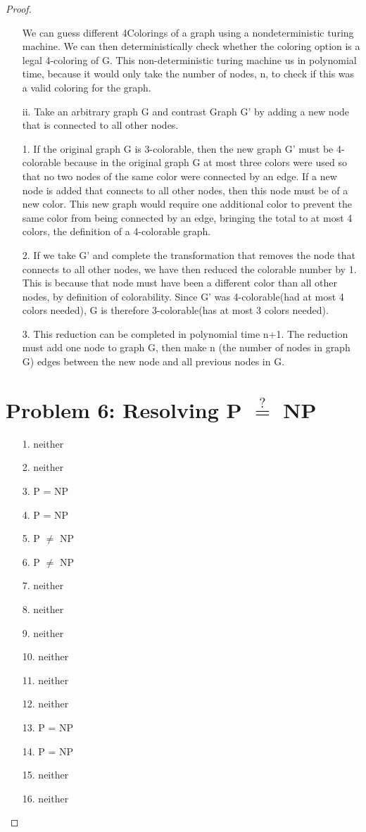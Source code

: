 \documentclass[10pt,letter]{article}
\begin{document}
\begin{proof}
\begin{enumerate}
We can guess different 4Colorings of a graph using a nondeterministic turing machine. We can then deterministically check whether the coloring option is a legal 4-coloring of G. This non-deterministic turing machine us in polynomial time, because it would only take the number of nodes, n, to check if this was a valid coloring for the graph. 
\item[ii.]
Take an arbitrary graph G and contrast Graph G' by adding a new node that is connected to all other nodes. 
\item[1.] If the original graph G is 3-colorable, then the new graph G' must be 4-colorable because in the original graph G at most three colors were used so that no two nodes of the same color were connected by an edge. If a new node is added that connects to all other nodes, then this node must be of a new color. This new graph would require one additional color to prevent the same color from being connected by an edge, bringing the total to at most 4 colors, the definition of  a 4-colorable graph. 
\item[2.]
If we take G' and complete the transformation that removes the node that connects to all other nodes, we have then reduced the colorable number by 1. This is because that node must have been a different color than all other nodes, by definition of colorability. Since G' was 4-colorable(had at most 4 colors needed), G is therefore 3-colorable(has at most 3 colors needed). 
\item[3.]
This reduction can be completed in polynomial time n+1. The reduction must add one node to graph G, then make n (the number of nodes in graph G) edges between the new node and all previous nodes in G. 
\end{enumerate}

\section*{Problem 6: Resolving P $\stackrel{?}{=}$ NP}

\begin{enumerate}
\item[1.] neither
\item[2.] neither
\item[3.] P = NP
\item[4.] P = NP
\item[5.] P $\neq$ NP
\item[6.] P $\neq$ NP
\item[7.] neither
\item[8.] neither
\item[9.] neither
\item[10.] neither
\item[11.] neither
\item[12.] neither
\item[13.] P = NP
\item[14.] P = NP
\item[15.] neither
\item[16.] neither
\end{enumerate}


\end{proof}
\end{document}
